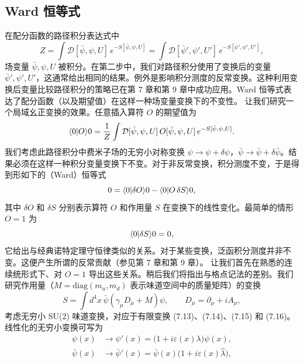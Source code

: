 \subsection{Ward 恒等式}
在配分函数的路径积分表达式中
\begin{equation}
Z = \int \mathcal{D}[\bar{\psi},\psi,U]\, e^{-S[\bar{\psi},\psi,U]}
  = \int \mathcal{D}[\bar{\psi}',\psi',U']\, e^{-S[\bar{\psi}',\psi',U']} ,
\end{equation}
场变量 $\bar{\psi},\psi, U$ 被积分。在第二步中，我们对路径积分使用了变换后的变量 $\bar{\psi}',\psi', U'$，这通常给出相同的结果。例外是影响积分测度的反常变换。这种利用变换后变量比较路径积分的策略已在第 7 章和第 9 章中成功应用。Ward 恒等式表达了配分函数（以及期望值）在这样一种场变量变换下的不变性。
让我们研究一个局域幺正变换的效果。任意插入算符 $O$ 的期望值为
\begin{equation}
\langle0|O\rangle{0} =
\frac{1}{Z}\int \mathcal{D}[\bar{\psi},\psi,U]\, O[\bar{\psi},\psi,U]\, e^{-S[\bar{\psi},\psi,U]} .
\end{equation}
我们考虑此路径积分中费米子场的无穷小对称变换 $\psi \to \psi + \delta\psi$，$\bar{\psi} \to \bar{\psi} + \delta\bar{\psi}$。结果必须在这样一种积分变量变换下不变。对于非反常变换，积分测度不变，于是得到形如下的（Ward）恒等式
\begin{equation}
0 = \langle0|\delta O\rangle{0} - \langle0|O\,\delta S\rangle{0} ,
\end{equation}
其中 $\delta O$ 和 $\delta S$ 分别表示算符 $O$ 和作用量 $S$ 在变换下的线性变化。最简单的情形 $O = 1$ 为
\begin{equation}
\langle0|\delta S\rangle{0} = 0 ,
\end{equation}
它给出与经典诺特定理守恒律类似的关系。对于某些变换，泛函积分测度并非不变。这便产生所谓的反常贡献（参见第 7 章和第 9 章）。
让我们首先在熟悉的连续统形式下、对 $O = 1$ 导出这些关系。稍后我们将指出与格点记法的差别。我们研究作用量（$M = \mathrm{diag}(m_u, m_d)$ 表示味道空间中的质量矩阵）的变换
\begin{equation}
S = \int d^4x\, \bar{\psi}(\gamma_\mu D_\mu + M)\psi , \qquad
D_\mu = \partial_\mu + iA_\mu ,
\end{equation}
考虑无穷小 SU(2) 味道变换，对应于有限变换 (7.13)、(7.14)、(7.15) 和 (7.16)。线性化的无穷小变换可写为
\begin{equation}
\begin{aligned}
\psi(x) &\to \psi'(x) = \bigl(1 + i\varepsilon(x)\lambda\bigr)\psi(x) , \\
\bar{\psi}(x) &\to \bar{\psi}'(x) = \bar{\psi}(x)\bigl(1 + i\varepsilon(x)\hat{\lambda}\bigr) ,
\end{aligned}
\end{equation}
